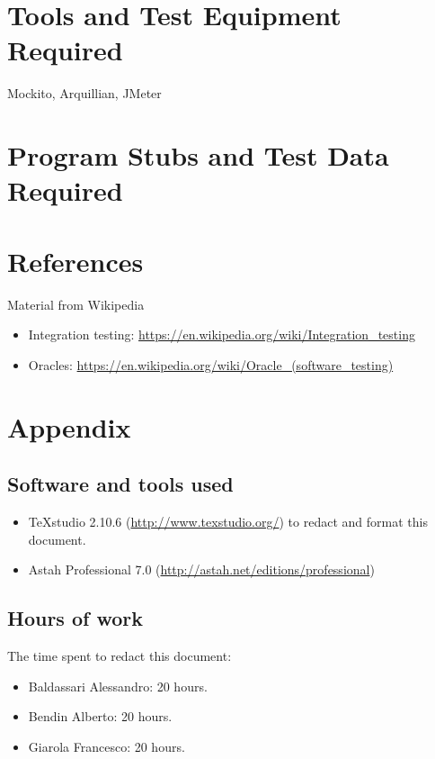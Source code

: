 \documentclass[a4paper,11pt]{report} %
\begin{document}
	\section{Tools and Test Equipment Required}
		Mockito, Arquillian, JMeter
	
	
	\section{Program Stubs and Test Data Required}
	
	\pagebreak
	\section{References}
		Material from Wikipedia
		\begin{itemize}
			\item Integration testing: \href{https://en.wikipedia.org/wiki/Integration_testing}{https://en.wikipedia.org/wiki/Integration\_testing}
			\item Oracles: \href{https://en.wikipedia.org/wiki/Oracle_(software_testing)}{https://en.wikipedia.org/wiki/Oracle\_(software\_testing)}
		\end{itemize}
	
	\section{Appendix}
	
	\subsection{Software and tools used}
	\begin{itemize}
		\item TeXstudio 2.10.6 (\href{http://www.texstudio.org/}{http://www.texstudio.org/}) to redact and format this document.
		\item Astah Professional 7.0 (\href{http://astah.net/editions/professional}{http://astah.net/editions/professional}) 
	\end{itemize}
	
	\subsection{Hours of work} The time spent to redact this document:
	\begin{itemize}
		\item Baldassari Alessandro: 20 hours.
		\item Bendin Alberto: 20 hours.
		\item Giarola Francesco: 20 hours.
	\end{itemize}
\end{document}
